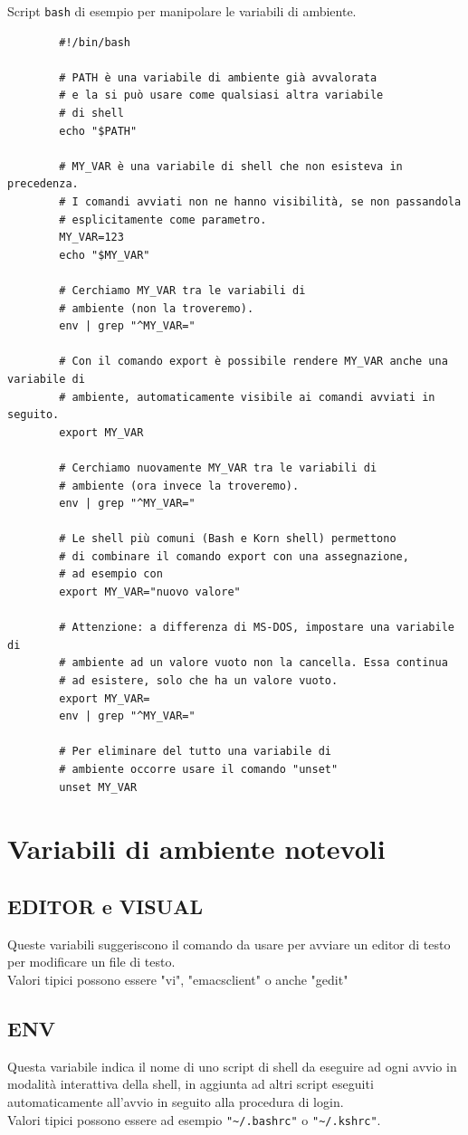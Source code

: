 \begin{esempio}
	Script \verb*|bash| di esempio per manipolare le variabili di ambiente.
	\begin{verbatim}
		#!/bin/bash
		
		# PATH è una variabile di ambiente già avvalorata
		# e la si può usare come qualsiasi altra variabile
		# di shell
		echo "$PATH"
		
		# MY_VAR è una variabile di shell che non esisteva in precedenza. 
		# I comandi avviati non ne hanno visibilità, se non passandola 
		# esplicitamente come parametro.
		MY_VAR=123
		echo "$MY_VAR"
		
		# Cerchiamo MY_VAR tra le variabili di 
		# ambiente (non la troveremo).
		env | grep "^MY_VAR="
		
		# Con il comando export è possibile rendere MY_VAR anche una variabile di
		# ambiente, automaticamente visibile ai comandi avviati in seguito. 
		export MY_VAR
		
		# Cerchiamo nuovamente MY_VAR tra le variabili di 
		# ambiente (ora invece la troveremo).
		env | grep "^MY_VAR="
		
		# Le shell più comuni (Bash e Korn shell) permettono
		# di combinare il comando export con una assegnazione,
		# ad esempio con
		export MY_VAR="nuovo valore"
		
		# Attenzione: a differenza di MS-DOS, impostare una variabile di
		# ambiente ad un valore vuoto non la cancella. Essa continua
		# ad esistere, solo che ha un valore vuoto.
		export MY_VAR=
		env | grep "^MY_VAR="
		
		# Per eliminare del tutto una variabile di
		# ambiente occorre usare il comando "unset"
		unset MY_VAR
	\end{verbatim}
\end{esempio}

\section{Variabili di ambiente notevoli}
\subsection{EDITOR e VISUAL}
Queste variabili suggeriscono il comando da usare per avviare un editor di testo per modificare un file di testo.\\
Valori tipici possono essere "vi", "emacsclient" o anche "gedit" 
\subsection{ENV}
Questa variabile indica il nome di uno script di shell da eseguire ad ogni avvio in modalità interattiva della shell, in aggiunta ad altri script eseguiti automaticamente all'avvio in seguito alla procedura di login.\\
Valori tipici possono essere ad esempio \verb*|"~/.bashrc"| o \verb*|"~/.kshrc"|. 
